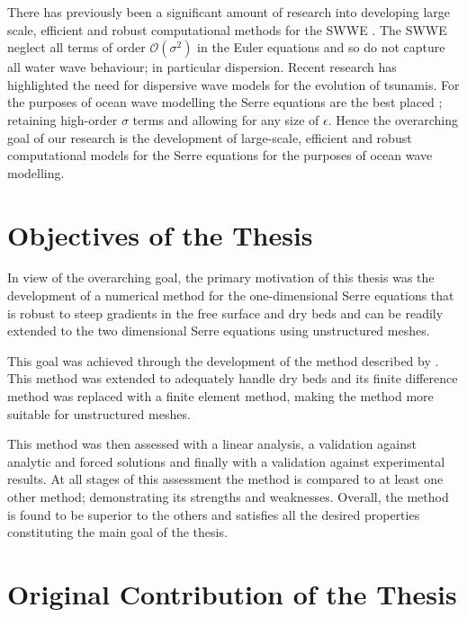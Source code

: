 There has previously been a significant amount of research into developing large scale, efficient and robust computational methods for the SWWE \cite{ClawPack,Comcot,ANUGA}. The SWWE neglect all terms of order $\mathcal{O}\left(\sigma ^2\right)$ in the Euler equations and so do not capture all water wave behaviour; in particular dispersion. Recent research \cite{Grue-etal-2008-113,Kirby-etal-2013-39} has highlighted the need for dispersive wave models for the evolution of tsunamis. For the purposes of ocean wave modelling the Serre equations are the best placed \cite{Bonneton-Lannes-2009-16601}; retaining high-order $\sigma$ terms and allowing for any size of $\epsilon$. Hence the overarching goal of our research is the development of large-scale, efficient and robust computational models for the Serre equations for the purposes of ocean wave modelling.

\section{Objectives of the Thesis}
%
%


In view of the overarching goal, the primary motivation of this thesis was the development of a numerical method for the one-dimensional Serre equations that is robust to steep gradients in the free surface and dry beds and can be readily extended to the two dimensional Serre equations using unstructured meshes. 

This goal was achieved through the development of the method described by \citet{Zoppou-2014}. This method was extended to adequately handle dry beds and its finite difference method was replaced with a finite element method, making the method more suitable for unstructured meshes. 

This method was then assessed with a linear analysis, a validation against analytic and forced solutions and finally with a validation against experimental results. At all stages of this assessment the method is compared to at least one other method; demonstrating its strengths and weaknesses. Overall, the method is found to be superior to the others and satisfies all the desired properties constituting the main goal of the thesis.

\section{Original Contribution of the Thesis}

